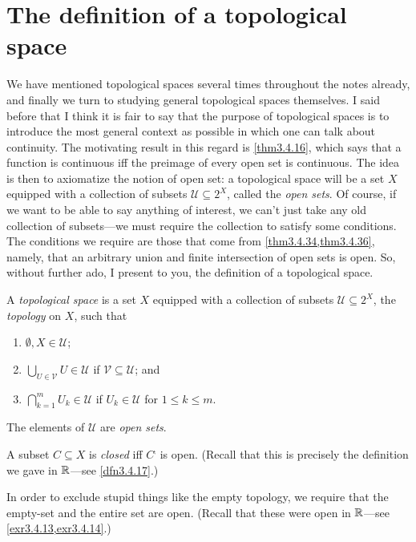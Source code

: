 \section{The definition of a topological space}

We have mentioned topological spaces several times throughout the notes already, and finally we turn to studying general topological spaces themselves.  I said before that I think it is fair to say that the purpose of topological spaces is to introduce the most general context as possible in which one can talk about continuity.  The motivating result in this regard is \cref{thm3.4.16}, which says that a function is continuous iff the preimage of every open set is continuous.  The idea is then to axiomatize the notion of open set:  a topological space will be a set $X$ equipped with a collection of subsets $\mathcal{U}\subseteq 2^X$, called the \emph{open sets}.  Of course, if we want to be able to say anything of interest, we can't just take any old collection of subsets---we must require the collection to satisfy some conditions.  The conditions we require are those that come from \cref{thm3.4.34,thm3.4.36}, namely, that an arbitrary union and finite intersection of open sets is open.  So, without further ado, I present to you, the definition of a topological space.
\begin{dfn}\label{TopologicalSpace}
A \emph{topological space} is a set $X$ equipped with a collection of subsets $\mathcal{U}\subseteq 2^X$, the \emph{topology} on $X$, such that
\begin{enumerate}
\item \label{enmTopologicalSpace.i}$\emptyset ,X\in \mathcal{U}$;
\item \label{enmTopologicalSpace.ii}$\bigcup _{U\in \mathcal{V}}U\in \mathcal{U}$ if $\mathcal{V}\subseteq \mathcal{U}$; and
\item \label{enmTopologicalSpace.iii}$\bigcap _{k=1}^mU_k\in \mathcal{U}$ if $U_k\in \mathcal{U}$ for $1\leq k\leq m$.
\end{enumerate}
\begin{rmk}
The elements of $\mathcal{U}$ are \emph{open sets}.
\end{rmk}
\begin{rmk}
A subset $C\subseteq X$ is \emph{closed} iff $C^{\comp}$ is open.  (Recall that this is precisely the definition we gave in $\mathbb{R}$---see \cref{dfn3.4.17}.)
\end{rmk}
\begin{rmk}
In order to exclude stupid things like the empty topology, we require that the empty-set and the entire set are open.  (Recall that these were open in $\mathbb{R}$---see \cref{exr3.4.13,exr3.4.14}.)
\end{rmk}
\end{dfn}
